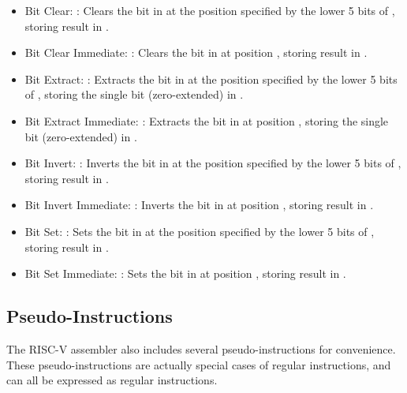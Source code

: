 \documentclass[11pt,pdftex,portrait,letterpaper]{article}
\begin{document}
\begin{itemize}
	\item Bit Clear: : Clears the bit in  at the position specified by the lower 5 bits of , storing result in .
	\item Bit Clear Immediate: : Clears the bit in  at position , storing result in .
	\item Bit Extract: : Extracts the bit in  at the position specified by the lower 5 bits of , storing the single bit (zero-extended) in .
	\item Bit Extract Immediate: : Extracts the bit in  at position , storing the single bit (zero-extended) in .
	\item Bit Invert: : Inverts the bit in  at the position specified by the lower 5 bits of , storing result in .
	\item Bit Invert Immediate: : Inverts the bit in  at position , storing result in .
	\item Bit Set: : Sets the bit in  at the position specified by the lower 5 bits of , storing result in .
	\item Bit Set Immediate: : Sets the bit in  at position , storing result in .
\end{itemize}

\subsection{Pseudo-Instructions}

The RISC-V assembler also includes several pseudo-instructions for convenience. These pseudo-instructions are actually special cases of regular instructions, and can all be expressed as regular instructions.
\end{document}
